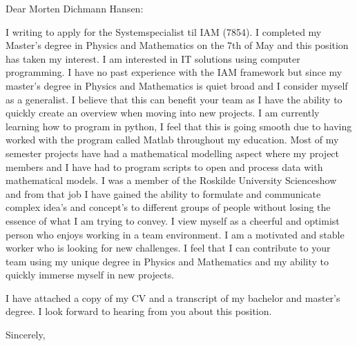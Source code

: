 \documentclass[10pt,a4paper]{letter}
\begin{document}
\begin{letter}{}
\opening{Dear Morten Dichmann Hansen:}

I writing to apply for the Systemspecialist til IAM (7854). I completed my Master's degree in Physics and Mathematics on the 7th of May and this position has taken my interest. I am interested in IT solutions using computer programming. I have no past experience with the IAM framework but since my master's degree in Physics and Mathematics is quiet broad and I consider myself as a generalist. I believe that this can benefit your team as I have the ability to quickly create an overview when moving into new projects. I am currently learning how to program in python, I feel that this is going smooth due to having worked with the program called Matlab throughout my education. Most of my semester projects have had a mathematical modelling aspect where my project members and I have had to program scripts to open and process data with mathematical models. I was a member of the Roskilde University Scienceshow and from that job I have gained the ability to formulate and communicate complex idea's and concept's to different groups of people without losing the essence of what I am trying to convey. I view myself as a cheerful and optimist person who enjoys working in a team environment. I am a motivated and stable worker who is looking for new challenges. I feel that I can contribute to your team using my unique degree in Physics and Mathematics and my ability to quickly immerse myself in new projects. 

I have attached a copy of my CV and a transcript of my bachelor and master's degree. I look forward to hearing from you about this position.   

\closing{Sincerely,}

\end{letter}

\end{document}
